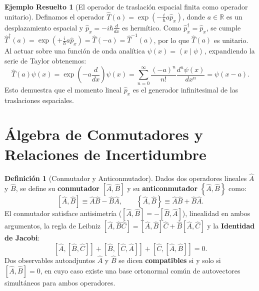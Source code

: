 \documentclass[11pt,a4paper,twoside]{report}
\theoremstyle{definition}
\newtheorem{definicion}{Definición}[chapter]
\newtheorem{ejemplo}{Ejemplo Resuelto}[chapter]
\theoremstyle{plain}
\theoremstyle{remark}
\newcommand{\braket}[2]{\left\langle #1 \middle| #2 \right\rangle}
\newcommand{\comm}[2]{\left[ #1, #2 \right]}
\newcommand{\acomm}[2]{\left\{ #1, #2 \right\}}
\newcommand{\op}[1]{\hat{#1}}
\begin{document}
\begin{ejemplo}[El operador de traslación espacial finita como operador unitario]
Definamos el operador $\op{T}(a) = \exp\left(-\frac{i}{\hbar} a \op{p}_x\right)$, donde $a \in \mathbb{R}$ es un desplazamiento espacial y $\op{p}_x = -i\hbar \frac{d}{dx}$ es hermítico. Como $\op{p}_x^\dagger = \op{p}_x$, se cumple $\op{T}^\dagger(a) = \exp\left(+\frac{i}{\hbar} a \op{p}_x\right) = \op{T}(-a) = \op{T}^{-1}(a)$, por lo que $\op{T}(a)$ es unitario. Al actuar sobre una función de onda analítica $\psi(x) = \braket{x}{\psi}$, expandiendo la serie de Taylor obtenemos:
\begin{equation}
    \op{T}(a)\psi(x) = \exp\left(-a \frac{d}{dx}\right)\psi(x) = \sum_{n=0}^{\infty} \frac{(-a)^n}{n!} \frac{d^n \psi(x)}{dx^n} = \psi(x - a).
\end{equation}
Esto demuestra que el momento lineal $\op{p}_x$ es el generador infinitesimal de las traslaciones espaciales.
\end{ejemplo}

\section{Álgebra de Conmutadores y Relaciones de Incertidumbre}

\begin{definicion}[Conmutador y Anticonmutador]
Dados dos operadores lineales $\op{A}$ y $\op{B}$, se define su \textbf{conmutador} $\comm{\op{A}}{\op{B}}$ y su \textbf{anticonmutador} $\acomm{\op{A}}{\op{B}}$ como:
\begin{equation}
    \comm{\op{A}}{\op{B}} \equiv \op{A}\op{B} - \op{B}\op{A}, \qquad \acomm{\op{A}}{\op{B}} \equiv \op{A}\op{B} + \op{B}\op{A}.
\end{equation}
El conmutador satisface antisimetría ($\comm{\op{A}}{\op{B}} = -\comm{\op{B}}{\op{A}}$), linealidad en ambos argumentos, la regla de Leibniz $\comm{\op{A}}{\op{B}\op{C}} = \comm{\op{A}}{\op{B}}\op{C} + \op{B}\comm{\op{A}}{\op{C}}$ y la \textbf{Identidad de Jacobi}:
\begin{equation}
    \comm{\op{A}}{\comm{\op{B}}{\op{C}}} + \comm{\op{B}}{\comm{\op{C}}{\op{A}}} + \comm{\op{C}}{\comm{\op{A}}{\op{B}}} = 0.
\end{equation}
Dos observables autoadjuntos $\op{A}$ y $\op{B}$ se dicen \textbf{compatibles} si y solo si $\comm{\op{A}}{\op{B}} = 0$, en cuyo caso existe una base ortonormal común de autovectores simultáneos para ambos operadores.
\end{definicion}
\end{document}
